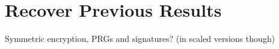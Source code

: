 \chapter{Recover Previous Results}

Symmetric encryption, PRGs and signatures? (in scaled versions though)